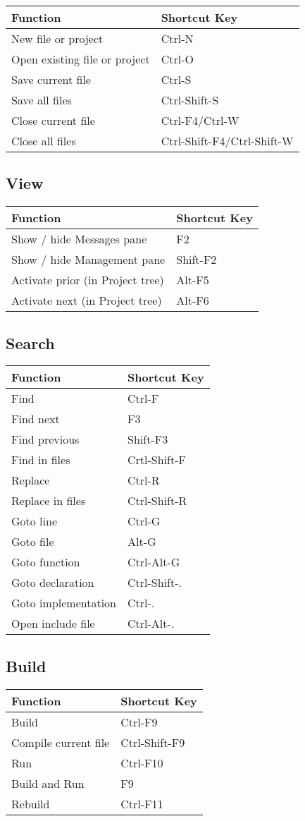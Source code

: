 \begin{tabular}{|l|l|}\hline
Function 		&	Shortcut Key\\ \hline
New file or project 	&	Ctrl-N\\ \hline
Open existing file or project &	Ctrl-O\\ \hline
Save current file 	&	Ctrl-S\\ \hline
Save all files 		&	Ctrl-Shift-S\\ \hline
Close current file 	&	Ctrl-F4/Ctrl-W\\ \hline
Close all files 	&	Ctrl-Shift-F4/Ctrl-Shift-W\\ \hline
\end{tabular}

\subsection{View}

\begin{tabular}{|l|l|}\hline
Function 		&	Shortcut Key\\ \hline
Show / hide Messages pane	&	F2\\ \hline
Show / hide Management pane 	&	Shift-F2\\ \hline
Activate prior (in Project tree) & 	Alt-F5\\ \hline
Activate next (in Project tree)  &	Alt-F6\\ \hline
\end{tabular}

\subsection{Search}

\begin{tabular}{|l|l|}\hline
Function 	&	Shortcut Key\\ \hline
Find 		&	Ctrl-F\\ \hline
Find next 	&	F3\\ \hline
Find previous 	&	Shift-F3\\ \hline
Find in files 	&	Crtl-Shift-F\\ \hline
Replace 	&	Ctrl-R\\ \hline
Replace in files &	Ctrl-Shift-R\\ \hline
Goto line 	&	Ctrl-G\\ \hline
Goto file 	&	Alt-G\\ \hline
Goto function 	&	Ctrl-Alt-G\\ \hline
Goto declaration & Ctrl-Shift-.\\ \hline
Goto implementation & Ctrl-.\\ \hline
Open include file & Ctrl-Alt-.\\ \hline
\end{tabular}

\subsection{Build}

\begin{tabular}{|l|l|}\hline
Function 	&	Shortcut Key\\ \hline
Build 		&	Ctrl-F9\\ \hline
Compile current file	&	Ctrl-Shift-F9\\ \hline
Run		&	Ctrl-F10\\ \hline
Build and Run 	&	F9\\ \hline
Rebuild 	&	Ctrl-F11\\ \hline
\end{tabular}
